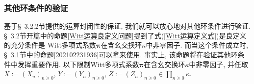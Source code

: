 \documentclass[UTF8, twoside]{ctexart}
\theoremstyle{nonumberplain}
\theoremstyle{nonumberplain}
\theoremstyle{plain}
\begin{document}
	\newpage
	\subsubsection{其他环条件的验证}
	基于\S~3.2.2节提供的运算封闭性的保证, 我们就可以放心地对其他环条件进行验证. \S~3.2节开篇中的命题\ref{Witt运算良定义问题}提到了式(\ref{Witt运算定义式})是良定义的充分条件是
	Witt多项式系数$\bm{\pi}$在含幺交换环$\kappa $中非零因子.
	而当这个条件成立时, \S~3.1节中的命题\ref{202102231936}可以拿来使用. 事实上, 该命题将在验证其他环条件中发挥重要作用. 
	以下限制Witt多项式系数$\bm{\pi}$在含幺交换环$\kappa $中非零因子, 
	并任取$X:={{\left( {{X}_{n}} \right)}_{n\ge 0}}$, $Y:={{\left( {{Y}_{n}} \right)}_{n\ge 0}}$, $Z:={{\left( {{Z}_{n}} \right)}_{n\ge 0}}\in \prod_{n\ge 0}^{{}}{\kappa }$.
	\vskip 0.5cm
	
\end{document}
